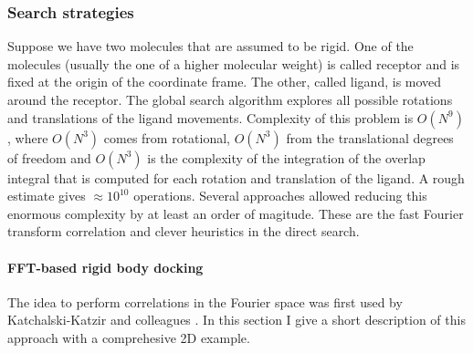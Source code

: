\subsubsection{Search strategies}
Suppose we have two molecules that are assumed to be rigid. One of the molecules (usually the one of a higher molecular weight) is called receptor and is fixed at the origin of the coordinate frame.
The other, called ligand, is moved around the receptor. The global search algorithm explores all possible rotations and translations of the ligand movements.
Complexity of this problem is $O(N^9)$, where $O(N^3)$ comes from rotational, $O(N^3)$ from the translational degrees of freedom and $O(N^3)$ is the complexity of the 
integration of the overlap integral that is computed for each rotation and translation of the ligand. A rough estimate
gives $\approx 10^{10}$\cite{huang2014search} operations. Several approaches allowed reducing this enormous complexity by at least an order of magitude.
These are the fast Fourier transform correlation and clever heuristics in the direct search.

\paragraph{FFT-based rigid body docking}
The idea to perform correlations in the Fourier space was first used by Katchalski-Katzir and colleagues \cite{katchalski1992molecular}. 
In this section I give a short description of this approach with a comprehesive 2D example.

